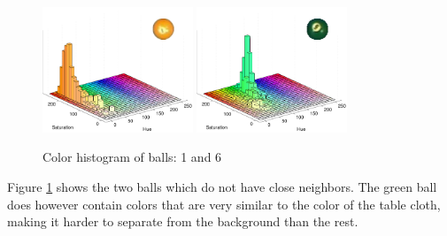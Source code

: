 \begin{figure}[H]
\centering
\subfloat
{
	\includegraphics[width=0.4\textwidth]{images/ballhist/1}
}
\subfloat
{
	\includegraphics[width=0.4\textwidth]{images/ballhist/6}
}
\caption{Color histogram of balls: 1 and 6}
\label{fig:ballhist-1-6}
\end{figure} 
Figure \ref{fig:ballhist-1-6} shows the two balls which do not have close neighbors. The green ball does however contain colors that are very similar to the color of the table cloth, making it harder to separate from the background than the rest.\\

